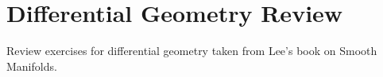 \chapter{Differential Geometry Review}
Review exercises for differential geometry taken from Lee's book on Smooth
Manifolds.


